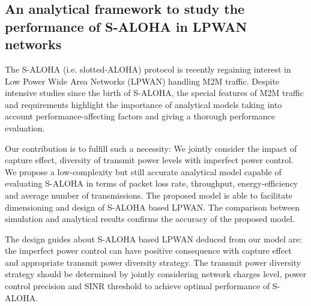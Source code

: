 
\subsection{An analytical framework to study the performance of S-ALOHA in LPWAN networks}
The S-ALOHA (i.e. slotted-ALOHA) protocol is recently regaining interest in Low Power Wide Area Networks (LPWAN) handling M2M traffic. Despite intensive studies since the birth of S-ALOHA, the special features of M2M traffic and requirements highlight the importance of analytical models taking into account performance-affecting factors and giving a thorough performance evaluation. 

Our contribution is to fulfill such a necessity: We jointly consider the impact of capture effect, diversity of transmit power levels with imperfect power control. We propose a low-complexity but still accurate analytical model capable of evaluating S-ALOHA in terms of packet loss rate, throughput, energy-efficiency and average number of transmissions. The proposed model is able to facilitate dimensioning and design of S-ALOHA based LPWAN. The comparison between simulation and analytical results confirms the accuracy of the proposed model. 

The design guides about S-ALOHA based LPWAN deduced from our model are: the imperfect power control can have positive consequence with capture effect and appropriate transmit power diversity strategy. The transmit power diversity strategy should be determined by jointly considering network charges level, power control precision and SINR threshold to achieve optimal performance of S-ALOHA.

